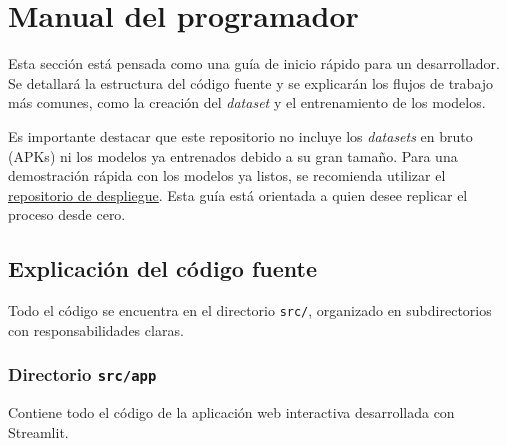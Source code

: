 \section{Manual del programador}
Esta sección está pensada como una guía de inicio rápido para un desarrollador. Se detallará la estructura del código fuente y se explicarán los flujos de trabajo más comunes, como la creación del \textit{dataset} y el entrenamiento de los modelos.

Es importante destacar que este repositorio no incluye los \textit{datasets} en bruto (APKs) ni los modelos ya entrenados debido a su gran tamaño. Para una demostración rápida con los modelos ya listos, se recomienda utilizar el \href{https://github.com/dtx1007/streamlit_malware_detection_app}{repositorio de despliegue}. Esta guía está orientada a quien desee replicar el proceso desde cero.

\subsection{Explicación del código fuente}
Todo el código se encuentra en el directorio \texttt{src/}, organizado en subdirectorios con responsabilidades claras.

\subsubsection{Directorio \texttt{src/app}}
Contiene todo el código de la aplicación web interactiva desarrollada con Streamlit.


